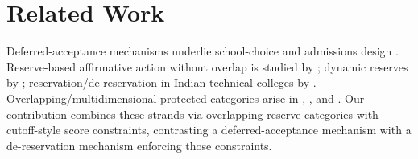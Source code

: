 \documentclass[10pt]{article}
\newcommand{\1}{\mathbf{1}}
\begin{document}
\section{Related Work}
Deferred-acceptance mechanisms underlie school-choice and admissions design \citep{GaSh62a,Roth08a,AbSo03b}. Reserve-based affirmative action without overlap is studied by \citet{Abdu05a}; dynamic reserves by \citet{AyTu20a}; reservation/de-reservation in Indian technical colleges by \citet{AyTu23a}. Overlapping/multidimensional protected categories arise in \citet{KHIY17a}, \citet{GKK+17a}, and \citet{AyBo21a}. Our contribution combines these strands via overlapping reserve categories with cutoff-style score constraints, contrasting a deferred-acceptance mechanism with a de-reservation mechanism enforcing those constraints.



\end{document}

